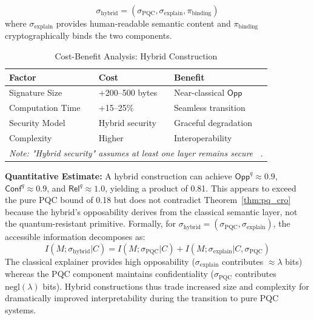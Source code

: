 \documentclass{ieeeaccess}
\newcommand{\Conf}{\mathsf{Conf}}
\newcommand{\Rel}{\mathsf{Rel}}
\newcommand{\Opp}{\mathsf{Opp}}
\begin{document}
\begin{equation}
    \sigma_{\text{hybrid}} = (\sigma_{\text{PQC}}, \sigma_{\text{explain}}, \pi_{\text{binding}})
\end{equation}
where $\sigma_{\text{explain}}$ provides human-readable semantic content and 
$\pi_{\text{binding}}$ cryptographically binds the two components.

\begin{table}[h]
\centering
\caption{Cost-Benefit Analysis: Hybrid Construction}
\label{tab:hybrid}
\small
\setlength{\tabcolsep}{3pt}
\begin{tabular}{p{3.0cm}p{2.2cm}p{2.2cm}}
\toprule
\textbf{Factor} & \textbf{Cost} & \textbf{Benefit} \\
\midrule
Signature Size & +200--500 bytes & Near-classical $\Opp$ \\
Computation Time & +15--25\% & Seamless transition \\
Security Model & Hybrid security & Graceful degradation \\
Complexity & Higher & Interoperability \\
\midrule
\multicolumn{3}{p{7.4cm}}{\footnotesize \textit{Note: "Hybrid security" assumes at least one layer remains secure ~\cite{Bindel2017}.}} \\
\bottomrule
\end{tabular}
\end{table}

\textbf{Quantitative Estimate:} A hybrid construction can achieve $\Opp^q \approx 0.9$, 
$\Conf^q \approx 0.9$, and $\Rel^q \approx 1.0$, yielding a product of 0.81. This 
appears to exceed the pure PQC bound of 0.18 but does not contradict 
Theorem~\ref{thm:pq_cro} because the hybrid's opposability derives from the 
classical semantic layer, not the quantum-resistant primitive. Formally, for 
$\sigma_{\text{hybrid}} = (\sigma_{\text{PQC}}, \sigma_{\text{explain}})$, the 
accessible information decomposes as:
\begin{equation}
    I(M;\sigma_{\text{hybrid}}|C) = I(M;\sigma_{\text{PQC}}|C) + I(M;\sigma_{\text{explain}}|C, \sigma_{\text{PQC}})
\end{equation}
The classical explainer provides high opposability ($\sigma_{\text{explain}}$ 
contributes $\approx \lambda$ bits)  whereas the PQC component maintains 
confidentiality ($\sigma_{\text{PQC}}$ contributes $\mathrm{negl}(\lambda)$ bits). 
Hybrid constructions thus trade increased size and complexity for dramatically 
improved interpretability during the transition to pure PQC systems.
\end{document}
